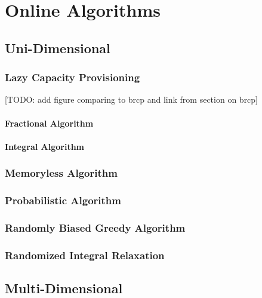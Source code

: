 
\chapter{Online Algorithms}\label{chapter:online_algorithms}

\section{Uni-Dimensional}

\subsection{Lazy Capacity Provisioning}\label{section:online_algorithms:ud:lazy_capacity_provisioning}

[TODO: add figure comparing to brcp and link from section on brcp]

\subsubsection{Fractional Algorithm}

\subsubsection{Integral Algorithm}

\subsection{Memoryless Algorithm}

\subsection{Probabilistic Algorithm}

\subsection{Randomly Biased Greedy Algorithm}

\subsection{Randomized Integral Relaxation}

\section{Multi-Dimensional}

